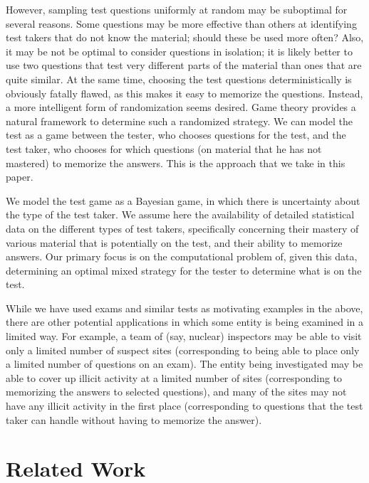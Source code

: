\documentclass{article}
\begin{document}
However, sampling test questions uniformly at random may be suboptimal
for several reasons.  Some questions may be more effective than others
at identifying test takers that do not know the material; should these
be used more often?  Also, it may be not be optimal to consider
questions in isolation; it is likely better to use two questions that
test very different parts of the material than ones that are quite
similar.  At the same time, choosing the test questions
deterministically is obviously fatally flawed, as this makes it easy
to memorize the questions.  Instead, a more intelligent form of
randomization seems desired.  Game theory provides a natural framework
to determine such a randomized strategy.  We can model the test as a
game between the tester, who chooses questions for the test, and the
test taker, who chooses for which questions (on material that he has
not mastered) to memorize the answers.  This is the approach that we
take in this paper.

We model the test game as a Bayesian game, in which there is
uncertainty about the type of the test taker.
We assume here the availability of detailed statistical data on the
different types of test takers, specifically concerning their mastery
of various material that is potentially on the test, and their ability
to memorize answers.  Our primary focus is on the computational
problem of, given this data, determining an optimal mixed strategy for
the tester to determine what is on the test.

While we have used exams and similar tests as motivating examples in
the above, there are other potential applications in which some entity
is being examined in a limited way.  For example, a team of (say,
nuclear) inspectors may be able to visit only a limited number of
suspect sites (corresponding to being able to place only a limited
number of questions on an exam).  The entity being investigated may be
able to cover up illicit activity at a limited number of sites
(corresponding to memorizing the answers to selected questions), and
many of the sites may not have any illicit activity in the first place
(corresponding to questions that the test taker can handle without
having to memorize the answer).

\section{Related Work}
\end{document}
